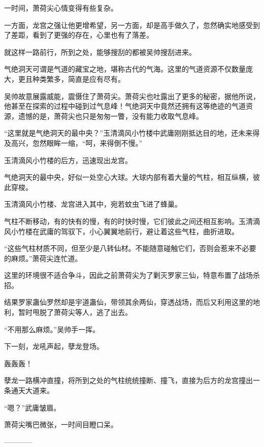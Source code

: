 \begin{this_body}
一时间，萧荷尖心情变得有些复杂。

一方面，龙宫之强让他更增希望，另一方面，却是高手做久了，忽然确实地感受到了差距，看到了更强的存在，心里也有了落差。

就这样一路前行，所到之处，能够搜刮的都被吴帅搜刮进来。

气绝洞天可谓是气道的藏宝之地，堪称古代的气海。这里的气道资源不仅数量庞大，更且种类繁多，简直是应有尽有。

吴帅故意展露威能，震慑住了萧荷尖。萧荷尖也吐露出了更多的秘密，据他所说，他甚至在探索的过程中碰到过气息峰！气绝洞天中竟然还拥有这等绝迹的气道资源，遗憾的是，萧荷尖也只是匆匆一瞥，没有能力收取气息峰。

“这里就是气绝洞天的最中央？”玉清滴风小竹楼中武庸刚刚抵达目的地，还未来得及高兴，忽然眼眸一缩，“呵，来得倒不慢。”

玉清滴风小竹楼的后方，迅速现出龙宫。

气绝洞天的最中央，好似一处空心大球。大球内部有着大量的气柱，相互纵横，彼此穿梭。

玉清滴风小竹楼、龙宫进入其中，宛若蚊虫飞进了蜂巢。

气柱不断移动，有的快有的慢，有的时快时慢，它们彼此之间还相互影响。玉清滴风小竹楼在武庸的驾驭下，小心翼翼地前行，避让着这些气柱，曲折进取。

“这些气柱材质不同，但至少是八转仙材。不能随意碰触它们，否则会惹来不必要的麻烦。”萧荷尖连忙道。

这里的环境很不适合争斗，因此之前萧荷尖为了剿灭罗家三仙，特意布置了战场杀招。

结果罗家蛊仙罗然却是宇道蛊仙，带领其余两仙，穿透战场，而后又利用这里的地利，暂时甩脱了萧荷尖等人，逃了出去。

“不用那么麻烦。”吴帅手一挥。

下一刻，龙吼声起，孽龙登场。

轰轰轰！

孽龙一路横冲直撞，将所到之处的气柱统统撞断、撞飞，直接为后方的龙宫撞出一条通天大道来。

“嗯？”武庸皱眉。

萧荷尖嘴巴微张，一时间目瞪口呆。

------------

\end{this_body}


